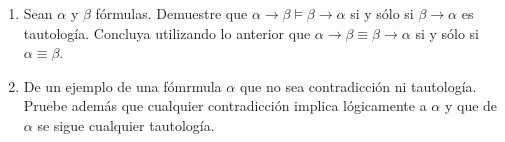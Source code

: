 \documentclass[letterpaper,DIV=15,headsepline,12pt]{scrartcl}
\begin{document}
\begin{enumerate}
\begin{multicols}{3}
\begin{enumerate}
                \item $\alpha \to \beta = \lnot \alpha \lor \beta $.
                \item $\lnot(\alpha \land \beta) \equiv \lnot \alpha \lor \lnot \beta$.
                \item $\lnot( \alpha \to \beta) \equiv \alpha \land \lnot \beta$.
                
                \item $\alpha \to (\beta \to \gamma) \equiv (\alpha \land \beta) \to \gamma $.
                \item $\lnot \alpha \equiv \alpha \to (\beta \land \lnot \beta)$.
                \item $\alpha \lor \lnot \alpha \equiv \alpha \to (\gamma \to \alpha)$.
            \end{enumerate}
            \end{multicols}
    
            \item Sean $\alpha$ y $\beta$ fórmulas. Demuestre que $\alpha \to \beta \vDash \beta \to \alpha$ si y sólo si $\beta \to \alpha$ es tautología. Concluya utilizando lo anterior que $\alpha \to \beta \equiv \beta \to \alpha$ si y sólo si $\alpha \equiv \beta$.
            
            \item De un ejemplo de una fómrmula $\alpha$ que no sea contradicción ni tautología. Pruebe además que cualquier contradicción implica lógicamente a $\alpha$ y que de $\alpha$ se sigue cualquier tautología.
            

\end{enumerate}
\end{document}

